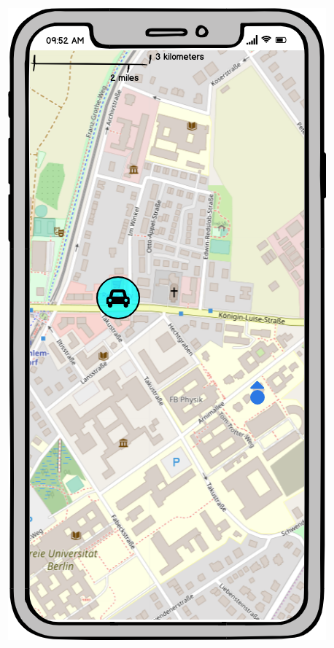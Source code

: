 \begin{figure}[h]
  \centering
  \begin{minipage}[b]{0.45\textwidth}
    \centering
    \includegraphics[width=0.75\textwidth]{images/UI/Iteration1-MapView-ParkingPositionDetermined.png}
  \end{minipage}
  \hfill
  \begin{minipage}[b]{0.45\textwidth}
    \centering

\end{minipage}
\end{figure}
